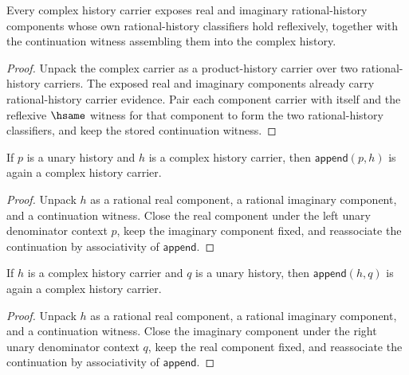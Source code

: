 \begin{theorem}
\label{thm:complex-history-carrier-component-reflexive-classifiers}
Every complex history carrier exposes real and imaginary rational-history
components whose own rational-history classifiers hold reflexively, together
with the continuation witness assembling them into the complex history.
\end{theorem}
\begin{proof}
Unpack the complex carrier as a product-history carrier over two
rational-history carriers. The exposed real and imaginary components already
carry rational-history carrier evidence. Pair each component carrier with
itself and the reflexive $\hsame$ witness for that component to form the two
rational-history classifiers, and keep the stored continuation witness.
\end{proof}

\begin{theorem}
\label{thm:complex-history-carrier-prepend-unary-closed}
If \(p\) is a unary history and \(h\) is a complex history carrier, then
\(\mathsf{append}(p,h)\) is again a complex history carrier.
\end{theorem}
\begin{proof}
Unpack \(h\) as a rational real component, a rational imaginary component,
and a continuation witness. Close the real component under the left unary
denominator context \(p\), keep the imaginary component fixed, and reassociate
the continuation by associativity of \(\mathsf{append}\).
\end{proof}

\begin{theorem}
\label{thm:complex-history-carrier-append-unary-closed}
If \(h\) is a complex history carrier and \(q\) is a unary history, then
\(\mathsf{append}(h,q)\) is again a complex history carrier.
\end{theorem}
\begin{proof}
Unpack \(h\) as a rational real component, a rational imaginary component,
and a continuation witness. Close the imaginary component under the right
unary denominator context \(q\), keep the real component fixed, and reassociate
the continuation by associativity of \(\mathsf{append}\).
\end{proof}

